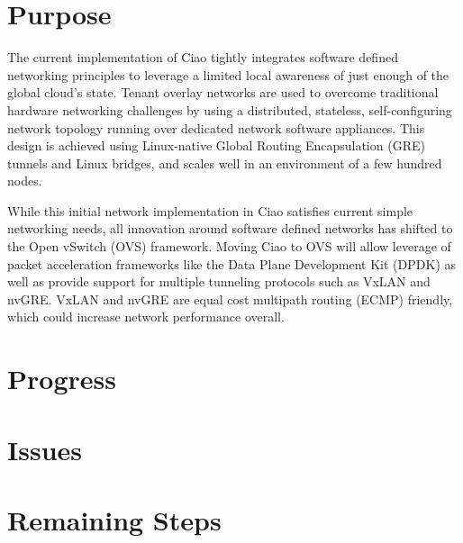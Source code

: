 \documentclass[10pt,onecolumn,journal,draftclsnofoot]{IEEEtran}
\begin{document}
\section{Purpose}

The current implementation of Ciao tightly integrates software defined
networking principles to leverage a limited local awareness of just enough of
the global cloud's state. Tenant overlay networks are used to overcome
traditional hardware networking challenges by using a distributed, stateless,
self-configuring network topology running over dedicated network software
appliances. This design is achieved using Linux-native Global Routing
Encapsulation (GRE) tunnels and Linux bridges, and scales well in an environment
of a few hundred nodes.

While this initial network implementation in Ciao satisfies current simple
networking needs, all innovation around software defined networks has
shifted to the Open vSwitch (OVS) framework. Moving Ciao to OVS will allow
leverage of packet acceleration frameworks like the Data Plane Development Kit
(DPDK) as well as provide support for multiple tunneling protocols such as VxLAN
and nvGRE. VxLAN and nvGRE are equal cost multipath routing (ECMP) friendly,
which could increase network performance overall.
\section{Progress}

\section{Issues}

\section{Remaining Steps}



\end{document}
